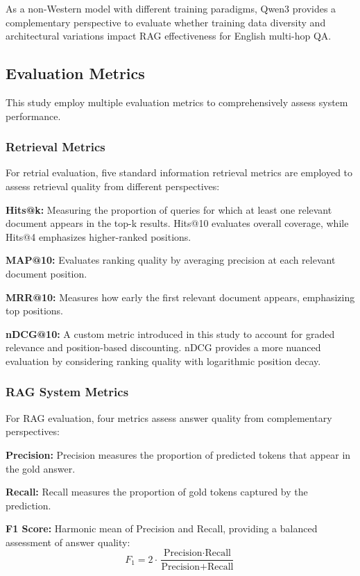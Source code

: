 \documentclass[10pt,twocolumn]{article}
\begin{document}
As a non-Western model with different training paradigms, Qwen3 provides a complementary perspective to evaluate whether training data diversity and architectural variations impact RAG effectiveness for English multi-hop QA.

\subsection{Evaluation Metrics}

This study employ multiple evaluation metrics to comprehensively assess system performance.

\subsubsection{Retrieval Metrics}

For retrial evaluation, five standard information retrieval metrics are employed to assess retrieval quality from different perspectives:

\textbf{Hits@k:} Measuring the proportion of queries for which at least one relevant document appears in the top-k results. Hits@10 evaluates overall coverage, while Hits@4 emphasizes higher-ranked positions.

\textbf{MAP@10:} Evaluates ranking quality by averaging precision at each relevant document position.

\textbf{MRR@10:} Measures how early the first relevant document appears, emphasizing top positions.

\textbf{nDCG@10:} A custom metric introduced in this study to account for graded relevance and position-based discounting. nDCG provides a more nuanced evaluation by considering ranking quality with logarithmic position decay.

\subsubsection{RAG System Metrics}

For RAG evaluation, four metrics assess answer quality from complementary perspectives:

\textbf{Precision:}  Precision measures the proportion of predicted tokens that appear in the gold answer.

\textbf{Recall:} Recall measures the proportion of gold tokens captured by the prediction.

\textbf{F1 Score:} Harmonic mean of Precision and Recall, providing a balanced assessment of answer quality:
$$
    F_1 = 2 \cdot \frac{\text{Precision} \cdot \text{Recall}}{\text{Precision} + \text{Recall}}
$$
\end{document}
